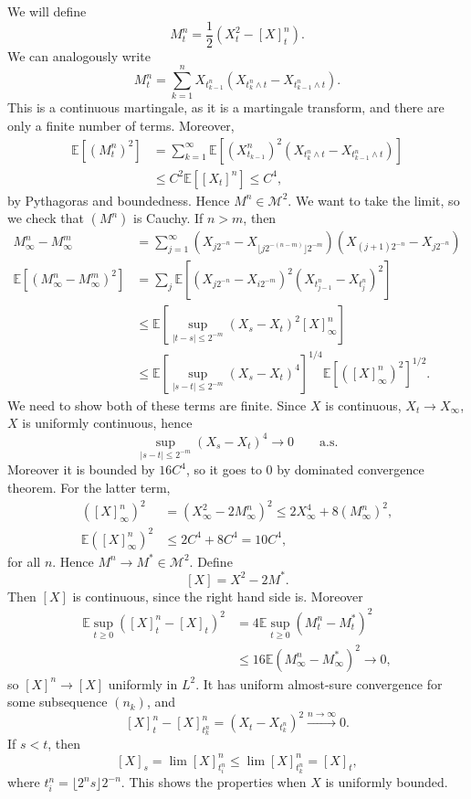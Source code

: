 \documentclass[12pt]{article}
\begin{document}
\begin{proofbox}
	We will define
	\[
		M_t^{n} = \frac 12 (X_t^2 - [X]_t^{n}).
	\]
	We can analogously write
	\[
	M_t^n = \sum_{k=1}^{n} X_{t_{k-1}^{n}} \left(X_{t_k^n \wedge t} - X_{t_{k-1}^n \wedge t} \right).
	\]
	This is a continuous martingale, as it is a martingale transform, and there are only a finite number of terms. Moreover,
	\begin{align*}
		\mathbb{E}[(M_t^n)^2] &= \sum_{k = 1}^\infty \mathbb{E}\left[ (X_{t_{k-1}}^n)^2 \left( X_{t_k^n \wedge t} - X_{t_{k-1}^n \wedge t} \right) \right] \\
				      &\leq C^2 \mathbb{E}[[X_t]^{n}] \leq C^{4},
	\end{align*}
	by Pythagoras and boundedness. Hence $M^{n} \in \mathcal{M}^2$. We want to take the limit, so we check that $(M^n)$ is Cauchy. If $n > m$, then
	\begin{align*}
		M_\infty^n - M_\infty^m &= \sum_{j = 1}^\infty \left( X_{j 2^{-n}} - X_{\lfloor j 2^{-(n-m)}\rfloor 2^{-m}} \right) \left(X_{(j+1)2^{-n}} - X_{j 2^{-n}} \right) \\
		\mathbb{E}[(M_\infty^n - M_\infty^m)^2] &= \sum_j \mathbb{E} \left[ \left( X_{j 2^{-n}} - X_{i 2^{-m}} \right)^2 \left(X_{t_{j-1}^n} - X_{t_j^n} \right)^2 \right] \\
							&\leq \mathbb{E} \left[ \sup_{|t-s| \leq 2^{-m}} (X_s - X_t)^2 [X]_\infty^{n} \right] \\
							&\leq \mathbb{E}\left[ \sup_{|s - t| \leq 2^{-m}} (X_s - X_t)^{4} \right]^{1/4} \mathbb{E}[([X]_\infty^{n})^2]^{1/2}.
	\end{align*}
	We need to show both of these terms are finite. Since $X$ is continuous, $X_t \to X_\infty$, $X$ is uniformly continuous, hence
	\[
		\sup_{|s-t|\leq2^{-m}} (X_s - X_t)^{4} \to 0 \qquad \text{a.s.}
	\]
	Moreover it is bounded by $16C^{4}$, so it goes to $0$ by dominated convergence theorem. For the latter term,
	\begin{align*}
		([X]_{\infty}^{n})^2 &= (X_\infty^2 - 2M_\infty^{n})^2 \leq 2 X_\infty^{4} + 8 (M_\infty^{n})^2, \\
		\mathbb{E} ([X]_\infty^n)^2 &\leq 2 C^{4} + 8 C^{4} = 10 C^{4},
	\end{align*}
	for all $n$. Hence $M^{n} \to M^{\ast} \in \mathcal{M}^2$. Define
	\[
		[X] = X^2 - 2M^{\ast}.
	\]
	Then $[X]$ is continuous, since the right hand side is. Moreover
	\begin{align*}
		\mathbb{E} \sup_{t \geq 0}([X]_t^n - [X]_t)^2 &= 4 \mathbb{E} \sup_{t \geq 0} (M_t^n - M_t^{\ast})^2 \\
							      &\leq 16 \mathbb{E} (M_\infty^{n} - M_\infty^{\ast})^2 \to 0,
	\end{align*}
	so $[X]^{n} \to [X]$ uniformly in $L^2$. It has uniform almost-sure convergence for some subsequence $(n_k)$, and
	\[
		[X]_t^{n} - [X]_{t_k^n}^{n} = (X_t - X_{t_k^n})^2 \overset{n \to \infty}\to 0.
	\]
	If $s < t$, then
	\[
		[X]_s = \lim [X]_{t_i^n}^n \leq \lim [X]_{t_k^n}^n = [X]_t,
	\]
	where $t_i^n = \lfloor 2^{n}s \rfloor 2^{-n}$. This shows the properties when $X$ is uniformly bounded.


\end{proofbox}
\end{document}
